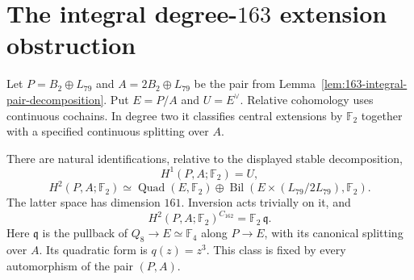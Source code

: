 \section{The integral degree-\(163\) extension obstruction}
\label{sec:163-relative-extension}

Let \(P=B_2\oplus L_{79}\) and \(A=2B_2\oplus L_{79}\)
be the pair from Lemma~\ref{lem:163-integral-pair-decomposition}.
Put \(E=P/A\) and \(U=E^\vee\).
Relative cohomology uses continuous cochains. In degree two
it classifies central extensions by \(\mathbb F_2\) together
with a specified continuous splitting over \(A\).

\begin{proposition}
\label{prop:163-relative-cohomology}
There are natural identifications, relative to the displayed
stable decomposition,
\[
 H^1(P,A;\mathbb F_2)=U,
\]
\begin{equation}
 H^2(P,A;\mathbb F_2)
  \simeq\operatorname{Quad}(E,\mathbb F_2)
       \oplus
       \operatorname{Bil}(E\times(L_{79}/2L_{79}),\mathbb F_2).
 \label{eq:163-relative-forms}
\end{equation}
The latter space has dimension \(161\).
Inversion acts trivially on it, and
\begin{equation}
 H^2(P,A;\mathbb F_2)^{C_{162}}
       =\mathbb F_2\,\mathfrak q.
 \label{eq:163-quaternion-line}
\end{equation}
Here \(\mathfrak q\) is the pullback of
\(Q_8\to E\simeq\mathbb F_4\) along \(P\to E\), with its
canonical splitting over \(A\). Its quadratic form is
\(q(z)=z^3\). This class is fixed by every automorphism
of the pair \((P,A)\).
\end{proposition}
